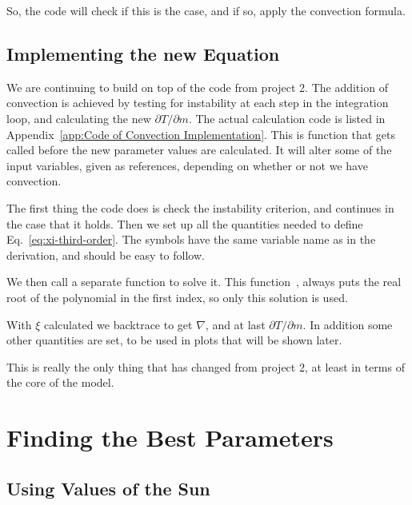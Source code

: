 \documentclass[11pt]{article}
\begin{document}
So, the code will check if this is the case, and if so, apply the convection formula.



\subsection{Implementing the new Equation}
\label{sub:Implementing the new Equation}

We are continuing to build on top of the code from project 2. The addition of convection is achieved by testing for instability at each step in the integration loop, and calculating the new $\partial T/\partial m$. The actual calculation code is listed in Appendix~\ref{app:Code of Convection Implementation}. This is function that gets called before the new parameter values are calculated. It will alter some of the input variables, given as references, depending on whether or not we have convection.

The first thing the code does is check the instability criterion, and continues in the case that it holds. Then we set up all the quantities needed to define Eq.~\eqref{eq:xi-third-order}. The symbols have the same variable name as in the derivation, and should be easy to follow.

We then call a separate function to solve it. This function~\cite[\texttt{include/thirdordersolver.hpp}]{github}, always puts the real root of the polynomial in the first index, so only this solution is used.

With $\xi$ calculated we backtrace to get $\nabla$, and at last $\partial T/ \partial m$. In addition some other quantities are set, to be used in plots that will be shown later.


This is really the only thing that has changed from project 2, at least in terms of the core of the model.

\section{Finding the Best Parameters}
\label{sec:Finding the Best Parameters}

\subsection{Using Values of the Sun}
\label{sub:Using Values of the Sun}
\end{document}
